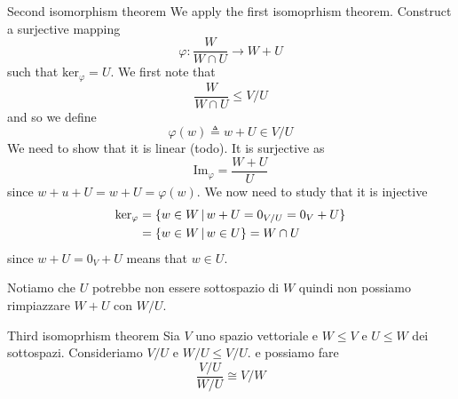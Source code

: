 \documentclass[a4paper]{article}
\begin{document}
\begin{snippetproof}{Second isomorphism theorem}
    We apply the first isomoprhism theorem. Construct a surjective mapping
    \[
        \varphi \colon \frac{W}{W \cap U} \to W + U
    \]
    such that \(\text{ker}_\varphi = U\).
    We first note that \[ \frac{W}{W \cap U} \leq V/U \]
    and so we define
    \[
        \varphi(w) \triangleq w + U \in V/U
    \]
    We need to show that it is linear (todo).
    It is surjective as
    \[
        \text{Im}_\varphi = \frac{W + U}{U}
    \]
    since \(w + u + U = w+ U = \varphi(w)\).
    We now need to study that it is injective
    \begin{align*}
        \text{ker}_\varphi &= \{
            w \in W \,|\, w + U = 0_{V/U} = 0_V + U
        \} \\
        &= \{
            w \in W \,|\,  w \in U
        \} = W \cap U
    \end{align*}
    since \(w + U = 0_V + U\) means that \(w \in U\).
\end{snippetproof}

Notiamo che \(U\) potrebbe non essere sottospazio di \(W\) quindi
non possiamo rimpiazzare \(W + U\) con \(W / U\).

\begin{snippettheorem}{Third isomoprhism theorem}
    Sia \(V\) uno spazio vettoriale e \(W \leq V\) e \(U \leq W\) dei
    sottospazi.
    Consideriamo \(V/U\) e \(W/U \leq V/U\).
    e possiamo fare
    \[
        \frac{V/U}{W/U} \cong V/W
    \]
\end{snippettheorem}
\end{document}
